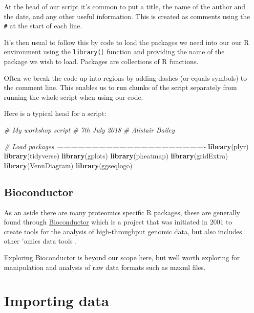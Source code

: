 \documentclass[12pt,]{book}
\newenvironment{Shaded}{\begin{snugshade}}{\end{snugshade}}
\newcommand{\KeywordTok}[1]{\textcolor[rgb]{0.13,0.29,0.53}{\textbf{#1}}}
\newcommand{\CommentTok}[1]{\textcolor[rgb]{0.56,0.35,0.01}{\textit{#1}}}
\newcommand{\NormalTok}[1]{#1}
\theoremstyle{definition}
\theoremstyle{definition}
\theoremstyle{definition}
\theoremstyle{remark}
\begin{document}
At the head of our script it's common to put a title, the name of the
author and the date, and any other useful information. This is created
as comments using the \texttt{\#} at the start of each line.

It's then usual to follow this by code to load the packages we need into
our our R environment using the \texttt{library()} function and
providing the name of the package we wish to load. Packages are
collections of R functions.

Often we break the code up into regions by adding dashes (or equals
symbols) to the comment line. This enables us to run chunks of the
script separately from running the whole script when using our code.

Here is a typical head for a script:

\begin{Shaded}
\begin{Highlighting}[]
\CommentTok{# My workshop script}
\CommentTok{# 7th July 2018}
\CommentTok{# Alistair Bailey}

\CommentTok{# Load packages ----------------------------------------------------------------}
\KeywordTok{library}\NormalTok{(plyr)}
\KeywordTok{library}\NormalTok{(tidyverse)}
\KeywordTok{library}\NormalTok{(gplots)}
\KeywordTok{library}\NormalTok{(pheatmap)}
\KeywordTok{library}\NormalTok{(gridExtra)}
\KeywordTok{library}\NormalTok{(VennDiagram)}
\KeywordTok{library}\NormalTok{(ggseqlogo)}
\end{Highlighting}
\end{Shaded}

\subsection{Bioconductor}\label{biocondutor}

As an aside there are many proteomics specific R packages, these are
generally found through
\href{https://www.bioconductor.org/}{Bioconductor} which is a project
that was initiated in 2001 to create tools for the analysis of
high-throughput genomic data, but also includes other 'omics data tools
\citep[\citet{huber2015}]{gentleman2004}.

Exploring Bioconductor is beyond our scope here, but well worth
exploring for manipulation and analysis of raw data formats such as
mzxml files.

\section{Importing data}\label{importing-data}
\end{document}
